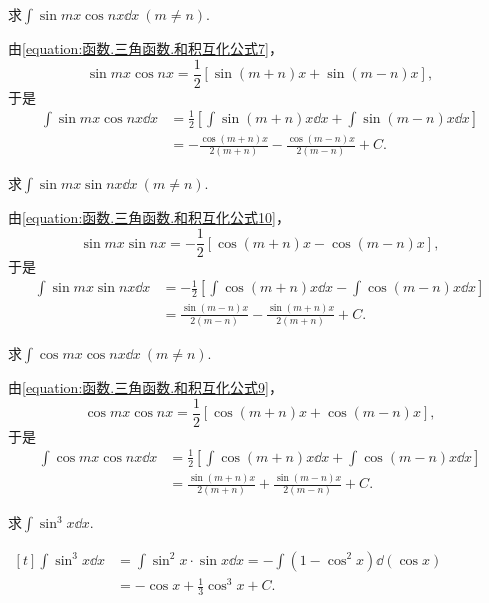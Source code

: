 \begin{example}
求\(\int \sin mx \cos nx \dd{x}\ (m \neq n)\).
\begin{solution}
由\cref{equation:函数.三角函数.和积互化公式7}，
\[
	\sin mx \cos nx
	= \frac12 [\sin(m+n)x + \sin(m-n)x],
\]
于是\begin{align}
	\int \sin mx \cos nx \dd{x}
	&= \frac12 \left[
		\int \sin(m+n)x \dd{x}
		+ \int \sin(m-n)x \dd{x}
	\right]
	\nonumber \\
	&= -\frac{\cos(m+n)x}{2(m+n)}
		- \frac{\cos(m-n)x}{2(m-n)}
		+ C.
\end{align}
\end{solution}
\end{example}

\begin{example}
求\(\int \sin mx \sin nx \dd{x}\ (m \neq n)\).
\begin{solution}
由\cref{equation:函数.三角函数.和积互化公式10}，
\[
	\sin mx \sin nx
	= -\frac12 [\cos(m+n)x - \cos(m-n)x],
\]
于是\begin{align}
	\int \sin mx \sin nx \dd{x}
	&= -\frac12 \left[
		\int \cos(m+n)x \dd{x}
		- \int \cos(m-n)x \dd{x}
	\right]
	\nonumber \\
	&= \frac{\sin(m-n)x}{2(m-n)}
		- \frac{\sin(m+n)x}{2(m+n)}
		+ C.
\end{align}
\end{solution}
\end{example}

\begin{example}
求\(\int \cos mx \cos nx \dd{x}\ (m \neq n)\).
\begin{solution}
由\cref{equation:函数.三角函数.和积互化公式9}，
\[
	\cos mx \cos nx
	= \frac12 [\cos(m+n)x + \cos(m-n)x],
\]
于是\begin{align}
	\int \cos mx \cos nx \dd{x}
	&= \frac12 \left[
		\int \cos(m+n)x \dd{x}
		+ \int \cos(m-n)x \dd{x}
	\right]
	\nonumber \\
	&= \frac{\sin(m+n)x}{2(m+n)}
		+ \frac{\sin(m-n)x}{2(m-n)}
		+ C.
\end{align}
\end{solution}
\end{example}

\begin{example}
求\(\int \sin^3 x \dd{x}\).
\begin{solution}
\(\begin{aligned}[t]
	\int \sin^3 x \dd{x}
	&= \int \sin^2 x \cdot \sin x \dd{x}
	= -\int (1 - \cos^2 x) \dd(\cos x) \\
	&= -\cos x + \frac{1}{3} \cos^3 x + C.
\end{aligned}\)
\end{solution}
\end{example}

